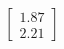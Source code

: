 \documentclass[preview]{standalone}
\begin{document}
\begin{align*}
\begin{bmatrix} 1.87 \\ 2.21 \end{bmatrix}
\end{align*}
\end{document}
